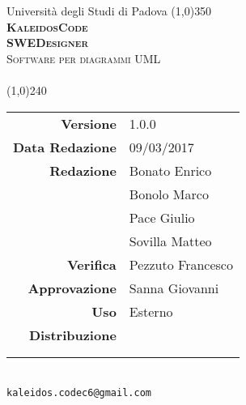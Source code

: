 \documentclass[a4paper,12pt]{article}
\author{KaleidosCode}
\date{09/03/2017}	%
\begin{document}
	\begin{titlepage}
		\centering Università degli Studi di Padova
		\line(1,0){350}\\
		\vspace{0.4cm}
		{\bfseries\scshape\LARGE KaleidosCode\\}
		\vspace{0.4cm}
		{\bfseries\scshape\LARGE SWEDesigner\\}
		{\scshape\Large Software per diagrammi UML\\}
		\vspace{1cm}
		{\scshape\Large \pianodiqualificai\ \\}		%
		\vspace{1.4cm}
		\logo
		\vspace{1.2cm}
		\line(1,0){240}\\
		\begin{tabular}{r|l}
			{\hfill \textbf{Versione}} 			& 1.0.0\\
			{\hfill \textbf{Data Redazione}} 	& 09/03/2017\\	%
			{\hfill \textbf{Redazione}} 		& Bonato Enrico\\ & Bonolo Marco\\ & Pace Giulio\\ & Sovilla Matteo\\
			{\hfill \textbf{Verifica}} 			& Pezzuto Francesco\\
			{\hfill \textbf{Approvazione}} 		& Sanna Giovanni\\
			{\hfill \textbf{Uso}} 				& Esterno\\
			{\hfill \textbf{Distribuzione}} 	& \vardanega \\ & \cardin \\ & \proponente\\
		\end{tabular}\\
		\vspace{2cm}
		\texttt{kaleidos.codec6@gmail.com}
	\end{titlepage}

	\pagestyle{myfront}
	\newpage
		
	\newpage
		\tableofcontents
	\pagestyle{mymain}
	\newpage
		
	\newpage
		
	\newpage
		
	\label{LastPage}
\end{document}
